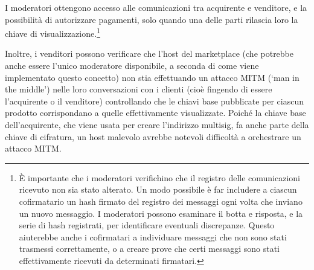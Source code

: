 I moderatori ottengono accesso alle comunicazioni tra acquirente e venditore, e la possibilità di autorizzare pagamenti, solo quando una delle parti rilascia loro la chiave di visualizzazione.\footnote{È importante che i moderatori verifichino che il registro delle comunicazioni ricevuto non sia stato alterato. Un modo possibile è far includere a ciascun cofirmatario un hash firmato del registro dei messaggi ogni volta che inviano un nuovo messaggio. I moderatori possono esaminare il botta e risposta, e la serie di hash registrati, per identificare eventuali discrepanze. Questo aiuterebbe anche i cofirmatari a individuare messaggi che non sono stati trasmessi correttamente, o a creare prove che certi messaggi sono stati effettivamente ricevuti da determinati firmatari.}

Inoltre, i venditori possono verificare che l'host del marketplace (che potrebbe anche essere l’unico moderatore disponibile, a seconda di come viene implementato questo concetto) non stia effettuando un attacco MITM (`man in the middle') nelle loro conversazioni con i clienti (cioè fingendo di essere l’acquirente o il venditore) controllando che le chiavi base pubblicate per ciascun prodotto corrispondano a quelle effettivamente visualizzate. Poiché la chiave base dell’acquirente, che viene usata per creare l’indirizzo multisig, fa anche parte della chiave di cifratura, un host malevolo avrebbe notevoli difficoltà a orchestrare un attacco MITM.